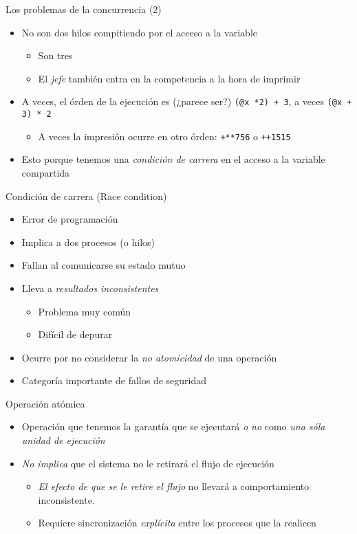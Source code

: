 \documentclass[presentation]{beamer}
\begin{document}
\begin{frame}[label={sec:org886ddd5},fragile]{Los problemas de la concurrencia (2)}
 \begin{itemize}
\item No son dos hilos compitiendo por el acceso a la variable
\begin{itemize}
\item Son tres
\item El \emph{jefe} también entra en la competencia a la hora de imprimir
\end{itemize}
\item A veces, el órden de la ejecución es (¿parece ser?) \texttt{(@x *2) + 3},
a veces \texttt{(@x + 3) * 2}
\begin{itemize}
\item A veces la impresión ocurre en otro órden: \texttt{+**756} o \texttt{++1515}
\end{itemize}
\item Esto porque tenemos una \emph{condición de carrera} en el acceso a la
variable compartida
\end{itemize}
\end{frame}

\begin{frame}[label={sec:orgff2128e}]{Condición de carrera (Race condition)}
\begin{itemize}
\item Error de programación
\item Implica a dos procesos (o hilos)
\item Fallan al comunicarse su estado mutuo
\item Lleva a \emph{resultados inconsistentes}
\begin{itemize}
\item Problema muy común
\item Difícil de depurar
\end{itemize}
\item Ocurre por no considerar la \emph{no atomicidad} de una operación
\item \alert{Categoría importante de fallos de seguridad}
\end{itemize}
\end{frame}

\begin{frame}[label={sec:orga1ab466}]{Operación atómica}
\begin{itemize}
\item Operación que tenemos la garantía que se ejecutará \emph{o no} como \emph{una
sóla unidad de ejecución}
\item \emph{No implica} que el sistema no le retirará el flujo de ejecución
\begin{itemize}
\item \emph{El efecto de que se le retire el flujo} no llevará a
comportamiento inconsistente.
\item Requiere sincronización \emph{explícita} entre los procesos que la realicen
\end{itemize}
\end{itemize}
\end{frame}
\end{document}
